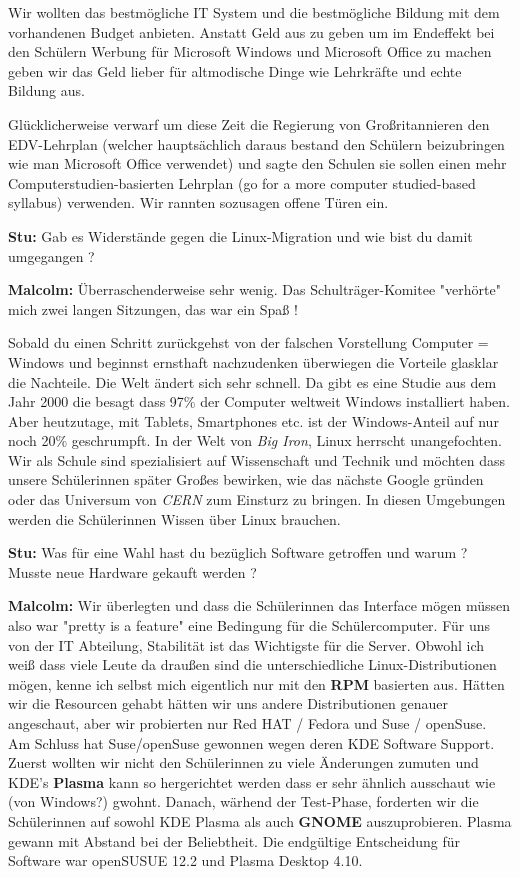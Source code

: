 \documentclass[10pt,a4paper,ngerman,twoside]{article} %
\begin{document}
Wir wollten das bestmögliche IT System und die bestmögliche Bildung mit dem vorhandenen Budget anbieten. Anstatt Geld aus zu geben um im Endeffekt bei den Schülern Werbung für Microsoft Windows und Microsoft Office zu machen geben wir das Geld lieber für altmodische Dinge wie Lehrkräfte und echte Bildung aus.

Glücklicherweise verwarf um diese Zeit die Regierung von Großritannieren den EDV-Lehrplan (welcher hauptsächlich daraus bestand den Schülern beizubringen wie man Microsoft Office verwendet) und sagte den Schulen sie sollen einen mehr Computerstudien-basierten Lehrplan (go for a more computer studied-based syllabus) verwenden. Wir rannten sozusagen offene Türen ein.

\textbf{Stu:} Gab es Widerstände gegen die Linux-Migration und wie bist du damit umgegangen ?

\textbf{Malcolm:} Überraschenderweise sehr wenig. Das Schulträger-Komitee "verhörte" mich zwei langen Sitzungen, das war ein Spaß ! 

Sobald du einen Schritt zurückgehst von der falschen Vorstellung Computer = Windows und beginnst ernsthaft nachzudenken überwiegen die Vorteile glasklar die Nachteile. Die Welt ändert sich sehr schnell. Da gibt es eine Studie aus dem Jahr 2000 die besagt dass 97\% der Computer weltweit Windows installiert haben. Aber heutzutage, mit Tablets, Smartphones etc. ist der Windows-Anteil auf nur noch 20\% geschrumpft. In der Welt von \textit{Big Iron}, Linux herrscht unangefochten. Wir als Schule  sind spezialisiert auf Wissenschaft und Technik und möchten dass unsere Schülerinnen später Großes bewirken, wie das nächste Google gründen oder das Universum von \textit{CERN} zum Einsturz zu bringen. In diesen Umgebungen werden die Schülerinnen Wissen über Linux brauchen.

\textbf{Stu:} Was für eine Wahl hast du bezüglich Software getroffen und warum ? Musste neue Hardware gekauft werden ?

\textbf{Malcolm:} Wir überlegten und dass die Schülerinnen das Interface mögen müssen also war "pretty is a feature" eine Bedingung für die Schülercomputer. Für uns von der IT Abteilung, Stabilität ist das Wichtigste für die Server. Obwohl ich weiß dass viele Leute da draußen sind die unterschiedliche Linux-Distributionen mögen, kenne ich selbst mich eigentlich nur mit den \textbf{RPM} basierten aus. Hätten wir die Resourcen gehabt hätten wir uns andere Distributionen genauer angeschaut, aber wir probierten nur Red HAT / Fedora und Suse / openSuse. Am Schluss hat Suse/openSuse gewonnen wegen deren KDE Software Support. Zuerst wollten wir nicht den Schülerinnen zu viele Änderungen zumuten und KDE's \textbf{Plasma} kann so hergerichtet werden dass er sehr ähnlich ausschaut wie (von Windows?) gwohnt. Danach, wärhend der Test-Phase, forderten wir die Schülerinnen auf sowohl KDE Plasma als auch \textbf{GNOME} auszuprobieren. Plasma gewann mit Abstand bei der Beliebtheit. Die endgültige Entscheidung für Software war openSUSUE 12.2 und Plasma Desktop 4.10.
\end{document}
